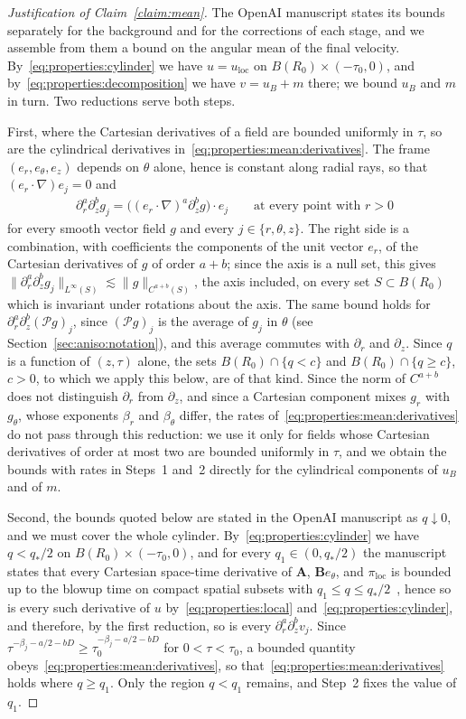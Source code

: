 \documentclass[11pt,reqno]{amsproc}
\numberwithin{equation}{section}
\theoremstyle{remark}
\newcommand{\p}{\partial}
\newcommand{\les}{\lesssim}
\begin{document}
\begin{proof}[Justification of Claim~\ref{claim:mean}]
The OpenAI manuscript states its bounds separately for the background and for the corrections of each stage, and we assemble from them a bound on the angular mean of the final velocity. By~\eqref{eq:properties:cylinder} we have $u=u_{\mathrm{loc}}$ on $B(R_0)\times(-\tau_0,0)$, and by~\eqref{eq:properties:decomposition} we have $v=u_B+m$ there; we bound $u_B$ and $m$ in turn. Two reductions serve both steps.

First, where the Cartesian derivatives of a field are bounded uniformly in $\tau$, so are the cylindrical derivatives in~\eqref{eq:properties:mean:derivatives}. The frame $(e_r,e_\theta,e_z)$ depends on $\theta$ alone, hence is constant along radial rays, so that $(e_r\cdot\nabla)e_j=0$ and
\begin{align*}
\p_r^a\p_z^bg_j=\bigl((e_r\cdot\nabla)^a\p_z^bg\bigr)\cdot e_j
\qquad\mbox{at every point with }r>0
\end{align*}
for every smooth vector field $g$ and every $j\in\{r,\theta,z\}$. The right side is a combination, with coefficients the components of the unit vector $e_r$, of the Cartesian derivatives of $g$ of order $a+b$; since the axis is a null set, this gives $\|\p_r^a\p_z^bg_j\|_{L^\infty(S)}\les\|g\|_{C^{a+b}(S)}$, the axis included, on every set $S\subset B(R_0)$ which is invariant under rotations about the axis. The same bound holds for $\p_r^a\p_z^b(\mathcal Pg)_j$, since $(\mathcal Pg)_j$ is the average of $g_j$ in $\theta$ (see Section~\ref{sec:aniso:notation}), and this average commutes with $\p_r$ and $\p_z$. Since $q$ is a function of $(z,\tau)$ alone, the sets $B(R_0)\cap\{q<c\}$ and $B(R_0)\cap\{q\ge c\}$, $c>0$, to which we apply this below, are of that kind. Since the norm of $C^{a+b}$ does not distinguish $\p_r$ from $\p_z$, and since a Cartesian component mixes $g_r$ with $g_\theta$, whose exponents $\beta_r$ and $\beta_\theta$ differ, the rates of~\eqref{eq:properties:mean:derivatives} do not pass through this reduction: we use it only for fields whose Cartesian derivatives of order at most two are bounded uniformly in $\tau$, and we obtain the bounds with rates in Steps~1 and~2 directly for the cylindrical components of $u_B$ and of $m$.

Second, the bounds quoted below are stated in the OpenAI manuscript as $q\downarrow0$, and we must cover the whole cylinder. By~\eqref{eq:properties:cylinder} we have $q<q_*/2$ on $B(R_0)\times(-\tau_0,0)$, and for every $q_1\in(0,q_*/2)$ the manuscript states that every Cartesian space-time derivative of $\mathbf A$, $\mathbf Be_\theta$, and $\pi_{\mathrm{loc}}$ is bounded up to the blowup time on compact spatial subsets with $q_1\le q\le q_*/2$~\cite[Theorem~3.1(ii), p.~15]{OpenAIManuscript}, hence so is every such derivative of $u$ by~\eqref{eq:properties:local} and~\eqref{eq:properties:cylinder}, and therefore, by the first reduction, so is every $\p_r^a\p_z^bv_j$. Since $\tau^{-\beta_j-a/2-bD}\ge\tau_0^{-\beta_j-a/2-bD}$ for $0<\tau<\tau_0$, a bounded quantity obeys~\eqref{eq:properties:mean:derivatives}, so that~\eqref{eq:properties:mean:derivatives} holds where $q\ge q_1$. Only the region $q<q_1$ remains, and Step~2 fixes the value of $q_1$.


\end{proof}
\end{document}
